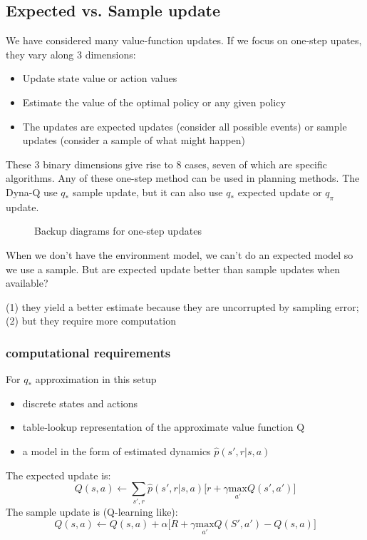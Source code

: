 \documentclass[sutton_barto_notes.tex]{subfiles}
\begin{document}
\subsection{Expected vs. Sample update}

We have considered many value-function updates. If we focus on one-step upates, they vary along 3 dimensions:
\begin{itemize}
\item Update state value or action values
\item Estimate the value of the optimal policy or any given policy
\item The updates are expected updates (consider all possible events) or sample updates (consider a sample of what might happen)
\end{itemize}
These 3 binary dimensions give rise to 8 cases, seven of which are specific algorithms.
Any of these one-step method can be used in planning methods. The Dyna-Q use $q_*$ sample update, but it can also use $q_*$ expected update or $q_\pi$ update.

\begin{figure}[h!]
    \centering
    \caption{ Backup diagrams for one-step updates }
\end{figure}

When we don’t have the environment model, we can’t do an expected model so we use a sample. But are expected update better than sample updates when available?

(1) they yield a better estimate because they are uncorrupted by sampling error; (2) but they require more computation

\subsubsection{computational requirements}

For $q_*$ approximation in this setup
\begin{itemize}
\item discrete states and actions
\item table-lookup representation of the approximate value function Q
\item a model in the form of estimated dynamics $\hat{p}(s',r|s,a)$
\end{itemize}
The expected update is:
$$ Q(s, a) \gets \sum_{s', r} \hat{p}(s', r|s, a) \big[r + \gamma \underset{a'}{\mathrm{max}} Q(s', a')\big] $$
The sample update is (Q-learning like):
$$ Q(s, a) \gets Q(s, a) + \alpha \big[ R + \gamma \underset{a'}{\mathrm{max}} Q(S', a') - Q(s, a)\big] $$
\end{document}
